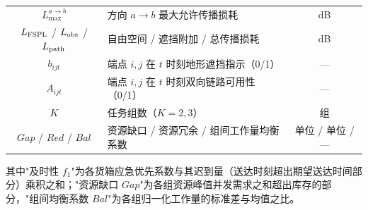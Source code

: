 \begin{table}[htbp]
\begin{tabular}{c|l|c}
$L_{\max}^{a\to b}$ & 方向 $a\to b$ 最大允许传播损耗 & dB \\
$L_{\rm FSPL}$ / $L_{\rm obs}$ / $L_{\rm path}$ & 自由空间 / 遮挡附加 / 总传播损耗 & dB \\
$b_{ijt}$ & 端点 $i,j$ 在 $t$ 时刻地形遮挡指示（0/1） & --- \\
$A_{ijt}$ & 端点 $i,j$ 在 $t$ 时刻双向链路可用性（0/1） & --- \\
$K$ & 任务组数（$K=2,3$） & 组 \\
$Gap$ / $Red$ / $Bal$ & 资源缺口 / 资源冗余 / 组间工作量均衡系数 & 单位 / 单位 / --- \\
\bottomrule
\end{tabular}
\end{table}

其中"及时性 $f_1$"为各货箱应急优先系数与其迟到量（送达时刻超出期望送达时间部分）乘积之和；"资源缺口 $Gap$"为各组资源峰值并发需求之和超出库存的部分，"组间均衡系数 $Bal$"为各组归一化工作量的标准差与均值之比。
